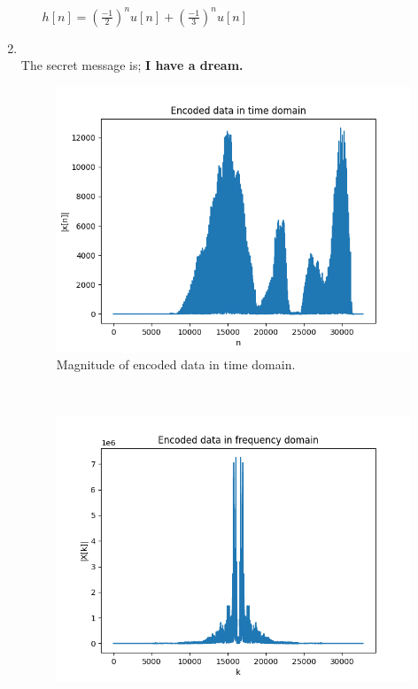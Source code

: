 \documentclass[10pt,a4paper, margin=1in]{article}
\begin{document}
\begin{enumerate}
\begin{enumerate}
              $h[n] = (\frac{-1}{2})^nu[n] + (\frac{-1}{3})^nu[n]$

          \end{enumerate}

    \item ~\\
          The secret message is; \textbf{I have a dream.}\\
          \begin{figure}[H]
            \includegraphics[scale = 0.75]{e_t}
            \caption{Magnitude of encoded data in time domain.}
          \end{figure}~\\
          \begin{figure}[H]
            \includegraphics[scale = 0.75]{e_f}

\end{figure}
\end{enumerate}
\end{document}
